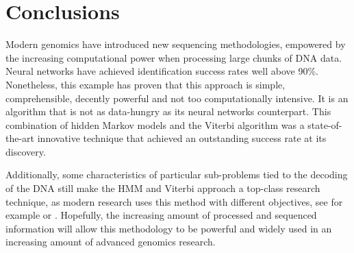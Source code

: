 \documentclass[a4paper, 11pt]{article} %
\begin{document}
\section*{Conclusions}

Modern genomics have introduced new sequencing methodologies, empowered by the increasing computational power when processing large chunks of DNA data. Neural networks have achieved identification success rates well above 90\%. Nonetheless, this example has proven that this approach is simple, comprehensible, decently powerful and not too computationally intensive. It is an algorithm that is not as data-hungry as its neural networks counterpart. This combination of hidden Markov models and the Viterbi algorithm was a state-of-the-art innovative technique that achieved an outstanding success rate at its discovery.

Additionally, some characteristics of particular sub-problems tied to the decoding of the DNA still make the HMM and Viterbi approach a top-class research technique, as modern research uses this method with different objectives, see for example \cite{schreiber} or \cite{zacher}. Hopefully, the increasing amount of processed and sequenced information will allow this methodology to be powerful and widely used in an increasing amount of advanced genomics research.


\medskip

\end{document}
